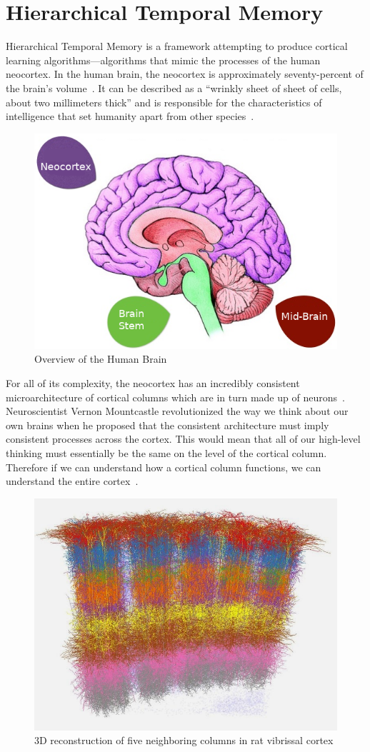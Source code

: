 \documentclass[oneside,12pt,openany]{book}
\begin{document}
	\section{Hierarchical Temporal Memory}
	
	Hierarchical Temporal Memory is a framework attempting to produce cortical learning algorithms---algorithms that mimic the processes of the human neocortex. In the human brain, the neocortex is approximately seventy-percent of the brain's volume~\cite{DiscoveriesBrainWorks}. It can be described as a ``wrinkly sheet of sheet of cells, about two millimeters thick'' and is responsible for the characteristics of intelligence that set humanity apart from other species~\cite{DiscoveriesBrainWorks}. 
	
	\begin{figure}[!ht]
		\centering
		\includegraphics[width=.5\linewidth]{images/Brain.png}
		\caption{Overview of the Human Brain}
		\label{fig:brain}
	\end{figure}
	
	For all of its complexity, the neocortex has an incredibly consistent microarchitecture of cortical columns which are in turn made up of neurons~\cite{DiscoveriesBrainWorks}. Neuroscientist Vernon Mountcastle revolutionized the way we think about our own brains when he proposed that the consistent architecture must imply consistent processes across the cortex. This would mean that all of our high-level thinking must essentially be the same on the level of the cortical column. Therefore if we can understand how a cortical column functions, we can understand the entire cortex~\cite{DiscoveriesBrainWorks}.	
	
	\begin{figure}[!ht]
		\centering
		\includegraphics[width=.6\linewidth]{images/CorticalColumns.jpg}
		\caption[3D reconstruction of five neighboring columns in rat vibrissal cortex]{3D reconstruction of five neighboring columns in rat vibrissal cortex\footnotemark}
		\label{CorticalColumn}
	\end{figure}
	
\end{document}
